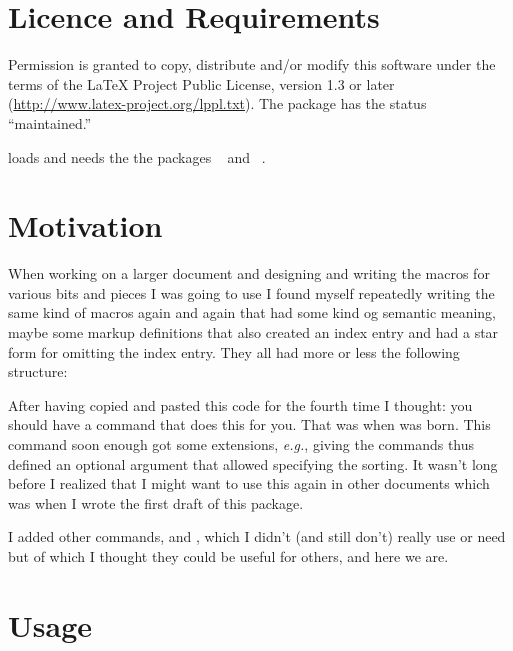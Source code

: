 \documentclass{cnpkgdoc}
\begin{document}
\section{Licence and Requirements}\label{sec:license}
Permission is granted to copy, distribute and/or modify this software under the
terms of the \LaTeX{} Project Public License, version 1.3 or later
(\url{http://www.latex-project.org/lppl.txt}). The package has the status
``maintained.''

\idxcmds loads and needs the the packages ~\cite{pkg:etoolbox}
and ~\cite{pkg:pgfopts}.

\section{Motivation}
When working on a larger document and designing and writing the macros for various
bits and pieces I was going to use I found myself repeatedly writing the same
kind of macros again and again that had some kind og semantic meaning, maybe some
markup definitions that also created an index entry and had a star form for
omitting the index entry. They all had more or less the following structure:

\begin{beispiel}
 \makeatletter
 \newcommand*\cmd{\@ifstar\cmd@star\cmd@nostar}
 \newcommand*\cmd@star[1]{\cmd@base{#1}}
 \newcommand*\cmd@nostar[1]{\cmd@base{#1}\cmd@idx{#1}}
 \newcommand*\cmd@base[1]{\textit{#1}}
 \newcommand*\cmd@idx[1]{\index{#1@\cmd@base{#1}}}
 \makeatother
\end{beispiel}

After having copied and pasted this code for the fourth time I thought: you
should have a command that does this for you. That was when 
was born. This command soon enough got some extensions, \emph{e.g.}, giving the
commands thus defined an optional argument that allowed specifying the sorting.
It wasn't long before I realized that I might want to use this 
again in other documents which was when I wrote the first draft of this package.

I added other commands,  and , which I
didn't (and still don't) really use or need but of which I thought they could be
useful for others, and here we are.

\section{Usage}\label{sec:usage}
\end{document}

